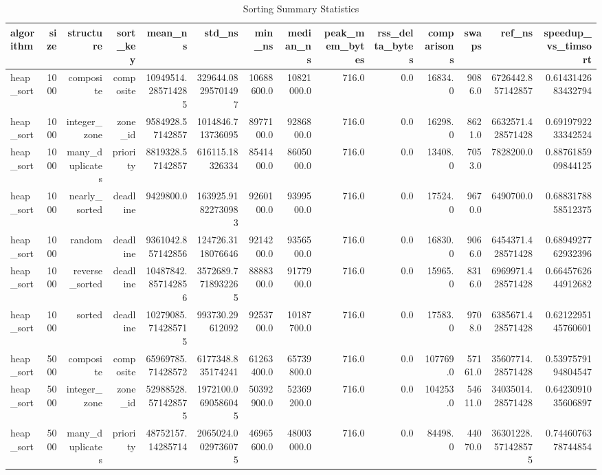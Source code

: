 \begin{table}[htbp]
\centering
\caption{Sorting Summary Statistics}
\label{tab:sorting_summary}
\begin{tabular}{lrrrrrrrrrrrrr}
\hline
algorithm & size & structure & sort_key & mean_ns & std_ns & min_ns & median_ns & peak_mem_bytes & rss_delta_bytes & comparisons & swaps & ref_ns & speedup_vs_timsort \\
\hline
heap_sort & 1000 & composite & composite & 10949514.285714285 & 329644.08295701497 & 10688600.0 & 10821000.0 & 716.0 & 0.0 & 16834.0 & 9086.0 & 6726442.857142857 & 0.6143142683432794 \\
heap_sort & 1000 & integer_zone & zone_id & 9584928.57142857 & 1014846.713736095 & 8977100.0 & 9286800.0 & 716.0 & 0.0 & 16298.0 & 8621.0 & 6632571.428571428 & 0.6919792233342524 \\
heap_sort & 1000 & many_duplicates & priority & 8819328.57142857 & 616115.18326334 & 8541400.0 & 8605000.0 & 716.0 & 0.0 & 13408.0 & 7053.0 & 7828200.0 & 0.8876185909844125 \\
heap_sort & 1000 & nearly_sorted & deadline & 9429800.0 & 163925.91822730983 & 9260100.0 & 9399500.0 & 716.0 & 0.0 & 17524.0 & 9670.0 & 6490700.0 & 0.6883178858512375 \\
heap_sort & 1000 & random & deadline & 9361042.857142856 & 124726.3118076646 & 9214200.0 & 9356500.0 & 716.0 & 0.0 & 16830.0 & 9066.0 & 6454371.428571428 & 0.6894927762932396 \\
heap_sort & 1000 & reverse_sorted & deadline & 10487842.857142856 & 3572689.7718932265 & 8888300.0 & 9177900.0 & 716.0 & 0.0 & 15965.0 & 8316.0 & 6969971.428571428 & 0.6645762644912682 \\
heap_sort & 1000 & sorted & deadline & 10279085.714285715 & 993730.29612092 & 9253700.0 & 10187700.0 & 716.0 & 0.0 & 17583.0 & 9708.0 & 6385671.428571428 & 0.6212295145760601 \\
heap_sort & 5000 & composite & composite & 65969785.71428572 & 6177348.835174241 & 61263400.0 & 65739800.0 & 716.0 & 0.0 & 107769.0 & 57161.0 & 35607714.28571428 & 0.5397579194804547 \\
heap_sort & 5000 & integer_zone & zone_id & 52988528.571428575 & 1972100.0690586045 & 50392900.0 & 52369200.0 & 716.0 & 0.0 & 104253.0 & 54611.0 & 34035014.28571428 & 0.6423091035606897 \\
heap_sort & 5000 & many_duplicates & priority & 48752157.14285714 & 2065024.0029736075 & 46965600.0 & 48003000.0 & 716.0 & 0.0 & 84498.0 & 44070.0 & 36301228.571428575 & 0.7446076378744854 \\

\end{tabular}
\end{table}
